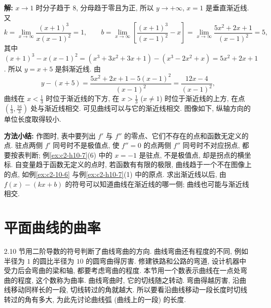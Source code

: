 \documentclass[UTF8,openany]{ctexbook}
\theoremstyle{chinesetextbook}
\newenvironment{cnsolution}{\par\indent\textbf{解:} \ignorespaces}{\par}
\begin{document}
\begin{cnsolution}
$x\to1$ 时分子趋于 $8$, 分母趋于零且为正, 所以 $y\to+\infty$, $x=1$ 是垂直渐近线. 又
\[
k=\lim_{x\to\infty}\frac{(x+1)^3}{x(x-1)^2}=1,\qquad b=\lim_{x\to\infty}\left[\frac{(x+1)^3}{(x-1)^2}-x\right]=\lim_{x\to\infty}\frac{5x^2+2x+1}{(x-1)^2}=5,
\]
其中 $(x+1)^3-x(x-1)^2=(x^3+3x^2+3x+1)-(x^3-2x^2+x)=5x^2+2x+1$. 所以 $y=x+5$ 是斜渐近线. 由
\[
y-(x+5)=\frac{5x^2+2x+1-5(x-1)^2}{(x-1)^2}=\frac{12x-4}{(x-1)^2},
\]
曲线在 $\displaystyle x<\frac13$ 时位于渐近线的下方, 在 $\displaystyle x>\frac13$ ($x\ne1$) 时位于渐近线的上方, 在点 $\displaystyle\left(\frac13,\frac{16}3\right)$ 处与渐近线相交. 可见曲线可以与它的渐近线相交. 图像如下, 纵轴方向的单位长度取得较小.
\begin{center}
\end{center}
\end{cnsolution}
\par\indent\textbf{方法小结:} 作图时, 表中要列出 $f'$ 与 $f''$ 的零点、它们不存在的点和函数无定义的点. 驻点两侧 $f'$ 同号时不是极值点, 使 $f''=0$ 的点两侧 $f''$ 同号时不对应拐点, 都要按表判断; 例\ref{ex:c2-h10-7}(6) 中的 $x=-1$ 是驻点, 不是极值点, 却是拐点的横坐标. 自变量趋于函数无定义的点时, 若函数有有限的极限, 曲线趋于一个不在图像上的点, 如例\ref{ex:c2-10-6} 与例\ref{ex:c2-h10-7}(1) 中的原点. 求出渐近线以后, 由 $f(x)-(kx+b)$ 的符号可以知道曲线在渐近线的哪一侧; 曲线也可能与渐近线相交.
\section{平面曲线的曲率}
2.10 节用二阶导数的符号判断了曲线弯曲的方向. 曲线弯曲还有程度的不同, 例如半径为 $1$ 的圆比半径为 $10$ 的圆弯曲得厉害. 修建铁路和公路的弯道, 设计机器中受力后会弯曲的梁和轴, 都要考虑弯曲的程度. 本节用一个数表示曲线在一点处弯曲的程度, 这个数称为曲率. 曲线弯曲时, 它的切线随之转动. 弯曲得越厉害, 沿曲线移动同样长的一段, 切线转过的角就越大. 所以要看沿曲线移动一段长度时切线转过的角有多大, 为此先讨论曲线弧 (曲线上的一段) 的长度.
\end{document}
